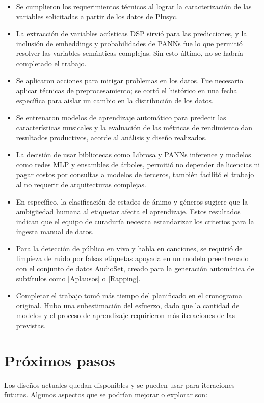 \begin{itemize}
\item Se cumplieron los requerimientos técnicos al lograr la caracterización de las variables solicitadas a partir de los datos de Plusyc.
\item La extracción de variables acústicas DSP sirvió para las predicciones, y la inclusión de embeddings y probabilidades de PANNs fue lo que permitió resolver las variables semánticas complejas. Sin esto último, no se habría completado el trabajo.
\item Se aplicaron acciones para mitigar problemas en los datos. Fue necesario aplicar técnicas de preprocesamiento; se cortó el histórico en una fecha específica para aislar un cambio en la distribución de los datos.
\item Se entrenaron modelos de aprendizaje automático para predecir las características musicales y la evaluación de las métricas de rendimiento dan resultados productivos, acorde al análisis y diseño realizados.
\item La decisión de usar bibliotecas como Librosa y PANNs inference y modelos como redes MLP y ensambles de árboles, permitió no depender de licencias ni pagar costos por consultas a modelos de terceros, también facilitó el trabajo al no requerir de arquitecturas complejas.
\item En específico, la clasificación de estados de ánimo y géneros sugiere que la ambigüedad humana al etiquetar afecta el aprendizaje. Estos resultados indican que el equipo de curaduría necesita estandarizar los criterios para la ingesta manual de datos.
\item Para la detección de público en vivo y habla en canciones, se requirió de limpieza de ruido por falsas etiquetas apoyada en un modelo preentrenado con el conjunto de datos AudioSet, creado para la generación automática de subtítulos como [Aplausos] o [Rapping].
\item Completar el trabajo tomó más tiempo del planificado en el cronograma original. Hubo una subestimación del esfuerzo, dado que la cantidad de modelos y el proceso de aprendizaje requirieron más iteraciones de las previstas.

\end{itemize}

\section{Próximos pasos}

Los diseños actuales quedan disponibles y se pueden usar para iteraciones futuras. Algunos aspectos que se podrían mejorar o explorar son:

